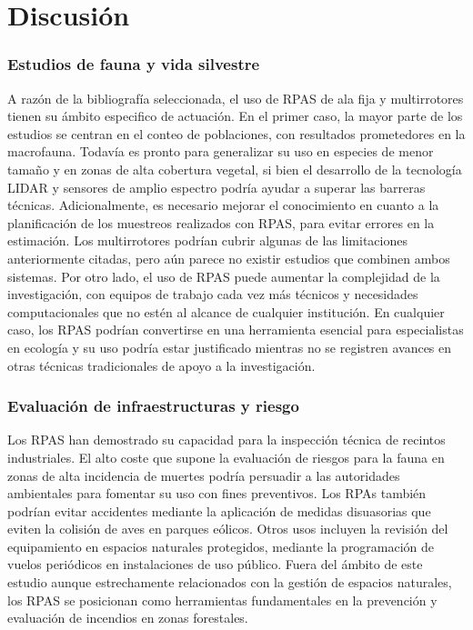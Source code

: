 \documentclass[onecolumn]{extarticle}
\begin{document}
\section{Discusión}\label{discusion}

\subsubsection{Estudios de fauna y vida
silvestre}\label{estudios-de-fauna-y-vida-silvestre-1}

A razón de la bibliografía seleccionada, el uso de RPAS de ala fija y
multirrotores tienen su ámbito especifico de actuación. En el primer
caso, la mayor parte de los estudios se centran en el conteo de
poblaciones, con resultados prometedores en la macrofauna. Todavía es
pronto para generalizar su uso en especies de menor tamaño y en zonas de
alta cobertura vegetal, si bien el desarrollo de la tecnología LIDAR y
sensores de amplio espectro podría ayudar a superar las barreras
técnicas. Adicionalmente, es necesario mejorar el conocimiento en cuanto
a la planificación de los muestreos realizados con RPAS, para evitar
errores en la estimación. Los multirrotores podrían cubrir algunas de
las limitaciones anteriormente citadas, pero aún parece no existir
estudios que combinen ambos sistemas. Por otro lado, el uso de RPAS
puede aumentar la complejidad de la investigación, con equipos de
trabajo cada vez más técnicos y necesidades computacionales que no estén
al alcance de cualquier institución. En cualquier caso, los RPAS podrían
convertirse en una herramienta esencial para especialistas en ecología y
su uso podría estar justificado mientras no se registren avances en
otras técnicas tradicionales de apoyo a la investigación.

\subsubsection{Evaluación de infraestructuras y
riesgo}\label{evaluacion-de-infraestructuras-y-riesgo-1}

Los RPAS han demostrado su capacidad para la inspección técnica de
recintos industriales. El alto coste que supone la evaluación de riesgos
para la fauna en zonas de alta incidencia de muertes podría persuadir a
las autoridades ambientales para fomentar su uso con fines preventivos.
Los RPAs también podrían evitar accidentes mediante la aplicación de
medidas disuasorias que eviten la colisión de aves en parques eólicos.
Otros usos incluyen la revisión del equipamiento en espacios naturales
protegidos, mediante la programación de vuelos periódicos en
instalaciones de uso público. Fuera del ámbito de este estudio aunque
estrechamente relacionados con la gestión de espacios naturales, los
RPAS se posicionan como herramientas fundamentales en la prevención y
evaluación de incendios en zonas forestales.
\end{document}
